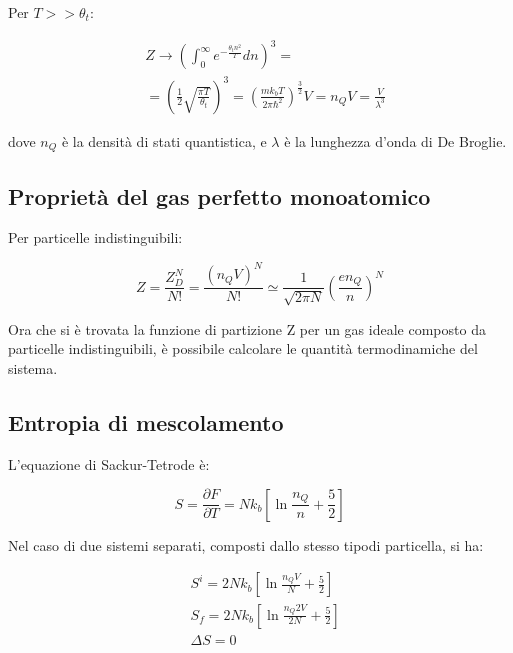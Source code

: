 \documentclass{article}
\begin{document}
Per $T>>\theta_t$:

\begin{equation}
    \begin{aligned}
         & Z \rightarrow \left(\int_{0}^{\infty} e^{-\frac{\theta_tn^2}{T}}dn\right)^3=                                                               \\
         & =\left(\frac{1}{2}\sqrt{\frac{\pi T}{\theta_t}}\right)^3= \left(\frac{mk_bT}{2\pi\hbar^2}\right)^{\frac{3}{2}}V= n_QV= \frac{V}{\lambda^3}
    \end{aligned}
\end{equation}

dove $n_Q$ è la densità di stati quantistica, e $\lambda$ è la lunghezza d'onda di De Broglie.

\subsection{Proprietà del gas perfetto monoatomico}

Per particelle indistinguibili:

\begin{equation}
    Z=\frac{Z_D^N}{N!}=\frac{(n_QV)^N}{N!}\simeq \frac{1}{\sqrt{2\pi N}}\left(\frac{en_Q}{n}\right)^N
\end{equation}

Ora che si è trovata la funzione di partizione Z per un gas ideale composto da particelle indistinguibili, è possibile calcolare
le quantità termodinamiche del sistema.

\subsection{Entropia di mescolamento}

L'equazione di Sackur-Tetrode è:

\begin{equation}
    S=\frac{\partial F}{\partial T}=Nk_b\left[\ln{\frac{n_Q}{n}}+\frac{5}{2}\right]
\end{equation}


Nel caso di due sistemi separati, composti dallo stesso tipodi particella, si ha:

\begin{equation}
    \begin{aligned}
         & S^i=2Nk_b\left[\ln{\frac{n_QV}{N}}+\frac{5}{2}\right]   \\
         & S_f=2Nk_b\left[\ln{\frac{n_Q2V}{2N}}+\frac{5}{2}\right] \\
         & \Delta S=0
    \end{aligned}
\end{equation}
\end{document}
